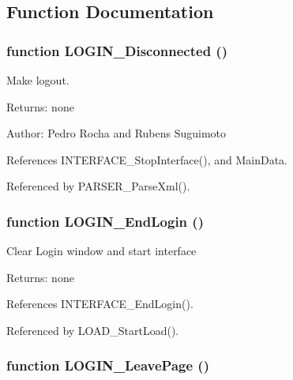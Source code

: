 \subsection{Function Documentation}
\subsubsection[LOGIN\_\-Disconnected]{\setlength{\rightskip}{0pt plus 5cm}function LOGIN\_\-Disconnected ()}\label{login_2login_8js_3eb7f5e1dac7fc523bbecca5a20df215}


Make logout. 

\begin{Desc}
\item[Returns:]none \end{Desc}
\begin{Desc}
\item[Author:]Pedro Rocha and Rubens Suguimoto \end{Desc}


References INTERFACE\_\-StopInterface(), and MainData.

Referenced by PARSER\_\-ParseXml().
\subsubsection[LOGIN\_\-EndLogin]{\setlength{\rightskip}{0pt plus 5cm}function LOGIN\_\-EndLogin ()}\label{login_2login_8js_0652e6ee839eb57fe5c2e5428b5be667}


Clear Login window and start interface

\begin{Desc}
\item[Returns:]none \end{Desc}


References INTERFACE\_\-EndLogin().

Referenced by LOAD\_\-StartLoad().
\subsubsection[LOGIN\_\-LeavePage]{\setlength{\rightskip}{0pt plus 5cm}function LOGIN\_\-LeavePage ()}\label{login_2login_8js_5b9ab913523cd8032cad106855420953}


